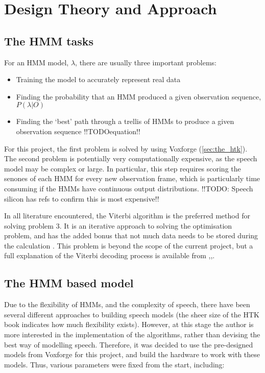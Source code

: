 \chapter{Design Theory and Approach} %
\label{cha:design_approach}



\section{The HMM tasks} %
\label{sec:hmm_tasks}
	For an HMM model, $\lambda$, there are usually three important problems: 
	\begin{itemize}
		\item Training the model to accurately represent real data
		\item Finding the probability that an HMM produced a given observation sequence, $P(\lambda | O)$
		\item Finding the `best' path through a trellis of HMMs to produce a given observation sequence !!TODOequation!!
	\end{itemize}
	For this project, the first problem is solved by using Voxforge (\ref{sec:the_htk}).  The second problem is potentially very computationally expensive, as the speech model may be complex or large.  In particular, this step requires scoring the senones of each HMM for every new observation frame, which is particularly time consuming if the HMMs have continuous output distributions. !!TODO: Speech silicon has refs to confirm this is most expensive!!

	In all literature encountered, the Viterbi algorithm is the preferred method for solving problem 3.  It is an iterative approach to solving the optimisation problem, and has the added bonus that not much data needs to be stored during the calculation \cite{schuster2006speech}.  This problem is beyond the scope of the current project, but a full explanation of the Viterbi decoding process is available from \cite{rabiner1989tutorial},\cite{melnikoff2003speech},\cite{saeed2008advanced}.

\section{The HMM based model} %
\label{sec:the_hmm_based_model}
	Due to the flexibility of HMMs, and the complexity of speech, there have been several different approaches to building speech models (the sheer size of the HTK book indicates how much flexibility exists).  However, at this stage the author is more interested in the implementation of the algorithms, rather than devising the best way of modelling speech.  Therefore, it was decided to use the pre-designed models from Voxforge for this project, and build the hardware to work with these models.  Thus, various parameters were fixed from the start, including:


